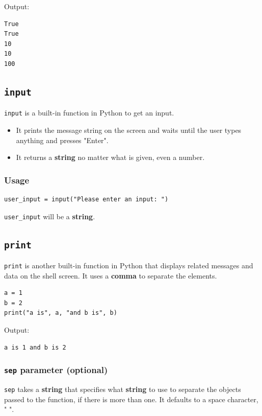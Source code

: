 \documentclass[11pt]{article}
\begin{document}
 \noindent Output:

\begin{verbatim}
True
True
10
10
100
\end{verbatim}

\subsection{\texttt{input}}
\label{sec:orga236a21}
\texttt{input} is a built-in function in Python to get an input.
\begin{itemize}
\item It prints the message string on the screen and waits until the user types anything and presses "Enter".
\item It returns a \textbf{string} no matter what is given, even a number.
\end{itemize}

\subsubsection{Usage}
\label{sec:orga35a9e7}
\begin{verbatim}
user_input = input("Please enter an input: ")
\end{verbatim}

 \noindent \texttt{user\_input} will be a \textbf{string}.

 \newpage

\subsection{\texttt{print}}
\label{sec:org8c5c8f6}
\texttt{print} is another built-in function in Python that displays related messages and data on the shell screen. It uses a \textbf{comma} to separate the elements.

\begin{verbatim}
a = 1
b = 2
print("a is", a, "and b is", b)
\end{verbatim}

 \noindent Output:

\begin{verbatim}
a is 1 and b is 2
\end{verbatim}

\subsubsection{\texttt{sep} parameter (optional)}
\label{sec:org02bf02a}
\texttt{sep} takes a \textbf{string} that specifies what \textbf{string} to use to separate the objects passed to the function, if there is more than one. It defaults to a space character, " ".
\end{document}
